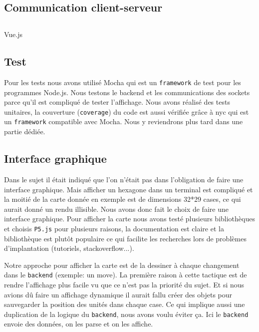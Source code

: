 \subsection{Communication client-serveur}



\subsection{}

Vue.js

\subsection{Test}

Pour les tests nous avons utilisé Mocha qui est un {\tt framework} de test pour les programmes Node.js.
Nous testons le backend et les communications des sockets parce qu'il est compliqué de tester l'affichage.
Nous avons réalisé des tests unitaires, la couverture ({\tt coverage}) du code est aussi vérifiée grâce à nyc qui est un {\tt framework} compatible avec Mocha.
Nous y reviendrons plus tard dans une partie dédiée.

\subsection{Interface graphique}

Dans le sujet il était indiqué que l'on n'était pas dans l'obligation de faire une interface graphique. Mais afficher un hexagone dans un terminal est compliqué et la moitié de la carte donnée en exemple est de dimensions 32*29 cases, ce qui aurait donné un rendu illisible. Nous avons donc fait le choix de faire une interface graphique. Pour afficher la carte nous avons testé plusieurs bibliothèques et choisis \lstinline{P5.js} pour plusieurs raisons, la documentation est claire et la bibliothèque est plutôt populaire ce qui facilite les recherches lors de problèmes d'implantation (tutoriels, stackoverflow...).

Notre approche pour afficher la carte est de la dessiner à chaque changement dans le \lstinline{backend} (exemple: un move). La première raison à cette tactique est de rendre l'affichage plus facile vu que ce n'est pas la priorité du sujet. Et si nous avions dû faire un affichage dynamique il aurait fallu créer des objets pour sauvegarder la position des unités dans chaque case. Ce qui implique aussi une duplication de la logique du \lstinline{backend}, nous avons voulu éviter ça. Ici le \lstinline{backend} envoie des données, on les parse et on les affiche.

